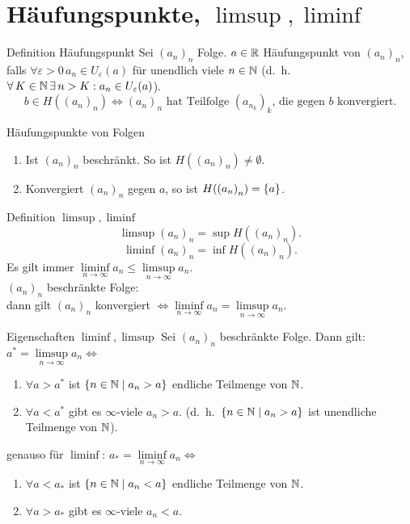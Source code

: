 \documentclass[main.tex]{subfiles}
\begin{document}
\section*{Häufungspunkte, \( \limsup, \liminf\)}

\begin{karte}{Definition Häufungspunkt}
    Sei \({(a_n)}_n\) Folge. \(a\in\mathbb{R} \) Häufungspunkt 
    von \({(a_n)}_n\), falls \(\forall\varepsilon>0\, 
    a_n\in U_\varepsilon(a) \) für unendlich viele 
    \(n\in\mathbb{N} \) (d.\ h.\  \( \forall K\in\N \,\exists 
    n>K:a_n \in U_\varepsilon (a) \)).
    \[ b\in H({(a_n)}_n) \Leftrightarrow 
    {(a_n)}_n \text{ hat Teilfolge } 
    {(a_{n_k})}_k \text{, die gegen } 
    b \text{ konvergiert}. \]
\end{karte}
\begin{karte}{Häufungspunkte von Folgen}
    \begin{enumerate}
        \item Ist \({(a_n)}_n\) beschränkt. 
        So ist \(H({(a_n)}_n) \neq \emptyset \).
        \item Konvergiert \({(a_n)}_n\) gegen 
        \(a\), so ist \( H({(a_n)}_n) = \{a\} \).
	\end{enumerate}
\end{karte}
\begin{karte}{Definition \( \limsup, \liminf \)}
    \[ \limsup {(a_n)}_n = \sup H({(a_n)}_n). \]
    \[ \liminf {(a_n)}_n = \inf H({(a_n)}_n). \]
    Es gilt immer \( \liminf\limits_{n\rightarrow\infty}
    a_n \leq \limsup\limits_{n\rightarrow\infty}a_n \). \\
    \({(a_n)}_n\) beschränkte Folge:\\
    dann gilt \({(a_n)}_n\) konvergiert \( \Leftrightarrow 
    \liminf\limits_{n\rightarrow\infty}
    a_n = \limsup\limits_{n\rightarrow\infty}a_n\).
\end{karte}
\begin{karte}{Eigenschaften \(\liminf, \limsup \)}
    Sei \({(a_n)}_n\) beschränkte Folge. Dann gilt:\\
	\(a^* = \limsup\limits_{n\rightarrow\infty}a_n \Leftrightarrow \)
	\begin{enumerate}
        \item \(\forall a> a^* \) ist \( \{n\in\mathbb{N} \;\vert \; a_n>a\} \) 
        endliche Teilmenge von \(\mathbb{N} \).
        \item \( \forall a<a^* \) gibt es \(\infty \)-viele \(a_n >a\). 
        (d.\ h.\  \( \{ n\in\mathbb{N} \;\vert \; a_n>a\} \) ist unendliche 
        Teilmenge von \(\mathbb{N} \)).
	\end{enumerate}
	genauso für \( \liminf \):
	\(a_* = \liminf\limits_{n\rightarrow\infty}a_n \Leftrightarrow \)
	\begin{enumerate}
        \item \(\forall a< a_* \) ist \( \{n\in\mathbb{N} \;\vert \; a_n<a\} \) 
        endliche Teilmenge von \(\mathbb{N} \).
		\item \( \forall a>a_* \) gibt es \(\infty \)-viele \(a_n<a\).
    \end{enumerate}
\end{karte}
\end{document}
